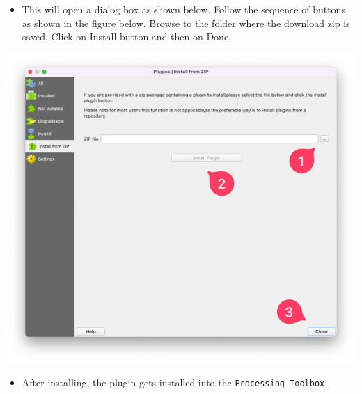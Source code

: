 \documentclass[
]{book}
\providecommand{\tightlist}{%
  \setlength{\itemsep}{0pt}\setlength{\parskip}{0pt}}
\begin{document}
\begin{itemize}
\tightlist
\item
  This will open a dialog box as shown below. Follow the sequence of buttons as shown in the figure below. Browse to the folder where the download zip is saved. Click on Install button and then on Done.
\end{itemize}

\includegraphics{./images/Installdialog.png}

\begin{itemize}
\tightlist
\item
  After installing, the plugin gets installed into the \texttt{Processing\ Toolbox}.
\end{itemize}
\end{document}
